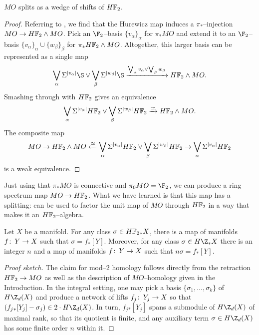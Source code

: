 \begin{lemma}\label{MOSplitsIntoHF2s}
\(MO\) splits as a wedge of shifts of \(\HFtwo\).
\end{lemma}
\begin{proof}
Referring to , we find that the Hurewicz map induces a \(\pi_*\)--injection \(MO \to \HFtwo \sm MO\).  Pick an \(\F_2\)--basis \(\{v_\alpha\}_\alpha\) for \(\pi_* MO\) and extend it to an \(\F_2\)--basis \(\{v_\alpha\}_\alpha \cup \{w_\beta\}_\beta\) for \(\pi_* \HFtwo \sm MO\).  Altogether, this larger basis can be represented as a single map \[\bigvee_\alpha \Susp^{|v_\alpha|} \S \vee \bigvee_\beta \Susp^{|w_\beta|} \S \xrightarrow{\bigvee_\alpha v_\alpha \vee \bigvee_\beta w_\beta} \HFtwo \sm MO.\]  Smashing through with \(\HFtwo\) gives an equivalence \[\bigvee_\alpha \Susp^{|v_\alpha|} \HFtwo \vee \bigvee_\beta \Susp^{|w_\beta|} \HFtwo \xrightarrow\simeq \HFtwo \sm MO.\]  The composite map \[MO \to \HFtwo \sm MO \xleftarrow\simeq \bigvee_\alpha \Susp^{|v_\alpha|} \HFtwo \vee \bigvee_\beta \Susp^{|w_\beta|} \HFtwo \to \bigvee_\alpha \Susp^{|v_\alpha|} \HFtwo\] is a weak equivalence.
\end{proof}

\begin{remark}
Just using that \(\pi_* MO\) is connective and \(\pi_0 MO = \F_2\), we can produce a ring spectrum map \(MO \to \HFtwo\).  What we have learned is that this map has a splitting:  can be used to factor the unit map of \(MO\) through \(\HFtwo\) in a way that makes it an \(\HFtwo\)--algebra.
\end{remark}

\begin{corollary}
Let \(X\) be a manifold.  For any class \(\sigma \in \HFtwo_* X\), there is a map of manifolds \(f\colon\thinspace Y \to X\) such that \(\sigma = f_* [Y]\).  Moreover, for any class \(\sigma \in H\Z_* X\) there is an integer $n$ and a map of manifolds \(f\colon\thinspace Y \to X\) such that \(n \sigma = f_* [Y]\).
\end{corollary}
\begin{proof}[Proof sketch]
The claim for mod--\(2\) homology follows directly from the retraction \(\HFtwo \to MO\) as well as the description of \(MO\)--homology given in the Introduction.  In the integral setting, one may pick a basis \(\{\sigma_1, \ldots, \sigma_k\}\) of \(H\Z_d(X)\) and produce a network of lifts \(f_j\colon\thinspace Y_j \to X\) so that \((f_j{}_*[Y_j] - \sigma_j) \in 2 \cdot H\Z_d(X)\).  In turn, \(f_j{}_*[Y_j]\) spans a submodule of \(H\Z_d(X)\) of maximal rank, so that its quotient is finite, and any auxiliary term \(\sigma \in H\Z_d(X)\) has some finite order \(n\) within it.
\end{proof}

